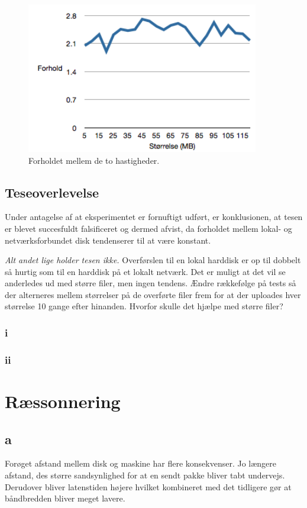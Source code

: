 \documentclass{article}
\begin{document}
\begin{figure}
	\includegraphics[width=4in]{plotforhold.png}
	\caption{Forholdet mellem de to hastigheder.}
	\label{plotforhold}
\end{figure}

\subsection{Teseoverlevelse}
Under antagelse af at eksperimentet er fornuftigt udført, er konklusionen, at tesen er blevet succesfuldt falsificeret og dermed afvist, da forholdet mellem lokal- og netværksforbundet disk tendenserer til at være konstant.

\textit{Alt andet lige holder tesen ikke.}
Overførslen til en lokal harddisk er op til dobbelt så hurtig som til en harddisk på et lokalt netværk.
Det er muligt at det vil se anderledes ud med større filer, men ingen tendens.
Ændre rækkefølge på tests så der alterneres mellem størrelser på de overførte filer frem for at der uploades hver størrelse 10 gange efter hinanden.
Hvorfor skulle det hjælpe med større filer?

\subsubsection{i}

\subsubsection{ii}

\section{Ræssonnering}

\subsection{a}
Forøget afstand mellem disk og maskine har flere konsekvenser. Jo længere afstand, des større sandsynlighed for at en sendt pakke bliver tabt undervejs. Derudover bliver latenstiden højere hvilket kombineret med det tidligere gør at båndbredden bliver meget lavere.
\end{document}

